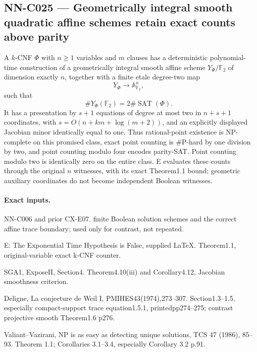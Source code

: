 \subsection{NN-C025 --- Geometrically integral smooth quadratic affine schemes retain exact counts above parity}
\begin{proposition}[NN-C025]
A $k$-CNF $\Phi$ with $n\geq1$ variables and $m$ clauses has a deterministic polynomial-time construction of a geometrically integral smooth affine scheme $Y_\Phi/\mathbb F_2$ of dimension exactly $n$, together with a finite etale degree-two map
\[
             Y_\Phi\longrightarrow\mathbb A^n_{\mathbb F_2},
\]
such that
\[
        \#Y_\Phi(\mathbb F_2)=2\#\operatorname{SAT}(\Phi).
\]
It has a presentation by $s+1$ equations of degree at most two in $n+s+1$ coordinates, with $s=O(n+km+\log(m+2))$, and an explicitly displayed Jacobian minor identically equal to one. Thus rational-point existence is NP-complete on this promised class, exact point counting is $\#\mathrm P$-hard by one division by two, and point counting modulo four encodes parity-SAT. Point counting modulo two is identically zero on the entire class. E evaluates these counts through the original $n$ witnesses, with its exact Theorem1.1 bound; geometric auxiliary coordinates do not become independent Boolean witnesses.
\end{proposition}
\paragraph{Exact inputs.}
NN-C006 and prior CX-E07. finite Boolean solution schemes and the correct affine trace boundary; used only for contrast, not repeated.

E: The Exponential Time Hypothesis is False, supplied LaTeX. Theorem1.1, original-variable exact k-CNF counter.

SGA1, ExposeII, Section4. Theorem4.10(iii) and Corollary4.12, Jacobian smoothness criterion.

Deligne, La conjecture de Weil I, PMIHES43(1974),273--307. Section1.3--1.5, especially compact-support trace equation1.5.1, printedpp274--275; contrast projective smooth Theorem1.6 p276.

Valiant--Vazirani, NP is as easy as detecting unique solutions, TCS 47 (1986), 85--93. Theorem 1.1; Corollaries 3.1--3.4, especially Corollary 3.2 p.91.

